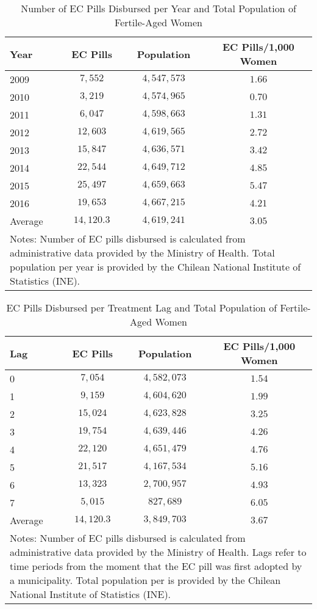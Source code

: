 \documentclass[12pt]{article}
\begin{document}
\begin{table}[htpb!]
  \centering
  \caption{Number of EC Pills Disbursed per Year and Total Population of Fertile-Aged Women}
  \label{tab:Npills}
  \begin{tabular}{lccc}
    \toprule
    Year & EC Pills & Population & EC Pills/1,000 Women \\ \midrule
    2009 & $7,552$  & $4,547,573$ & $1.66$ \\
    2010 & $3,219$  & $4,574,965$ & $0.70$ \\
    2011 & $6,047$  & $4,598,663$ & $1.31$ \\
    2012 & $12,603$ & $4,619,565$ & $2.72$ \\
    2013 & $15,847$ & $4,636,571$ & $3.42$ \\
    2014 & $22,544$ & $4,649,712$ & $4.85$ \\
    2015 & $25,497$ & $4,659,663$ & $5.47$ \\
    2016 & $19,653$ & $4,667,215$ & $4.21$ \\ \midrule
    Average & $14,120.3$ & $4,619,241$ & $3.05$ \\ \bottomrule
    \multicolumn{4}{p{9.8cm}}{\footnotesize Notes: Number of EC pills disbursed
      is calculated from administrative data provided by the Ministry of Health.
      Total population per year is provided by the Chilean National Institute of
      Statistics (INE).}
  \end{tabular}
\end{table}

\begin{table}[htpb!]
  \centering
  \caption{EC Pills Disbursed per Treatment Lag and Total Population of Fertile-Aged Women}
  \label{tab:NpillsLag}
  \begin{tabular}{lccc}
    \toprule
    Lag  & EC Pills & Population & EC Pills/1,000 Women \\ \midrule
    0 & $7,054$   & $4,582,073$ & $1.54$ \\
    1 & $9,159$   & $4,604,620$ & $1.99$ \\
    2 & $15,024$  & $4,623,828$ & $3.25$ \\
    3 & $19,754$  & $4,639,446$ & $4.26$ \\
    4 & $22,120$  & $4,651,479$ & $4.76$ \\
    5 & $21,517$  & $4,167,534$ & $5.16$ \\
    6 & $13,323$  & $2,700,957$ & $4.93$ \\
    7 & $5,015$   & $827,689$   & $6.05$ \\ \midrule
    Average & $14,120.3$ & $3,849,703$ & $3.67$ \\ \bottomrule
    \multicolumn{4}{p{9.8cm}}{\footnotesize Notes: Number of EC pills disbursed
      is calculated from administrative data provided by the Ministry of Health.  Lags refer to time periods from the moment that the EC pill was first adopted by a municipality.
      Total population per is provided by the Chilean National Institute of
      Statistics (INE).}
  \end{tabular}
\end{table}
\end{document}
